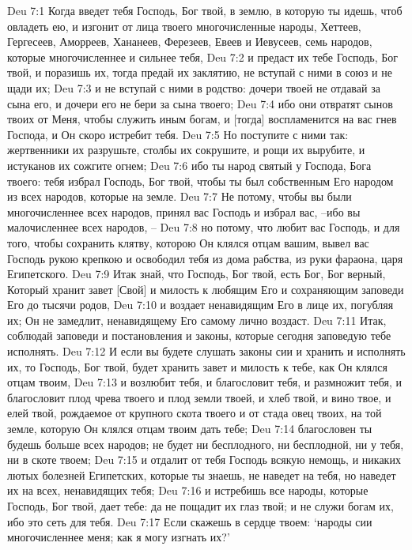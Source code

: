 Deu 7:1  Когда введет тебя Господь, Бог твой, в землю, в которую ты идешь, чтоб овладеть ею, и изгонит от лица твоего многочисленные народы, Хеттеев, Гергесеев, Аморреев, Хананеев, Ферезеев, Евеев и Иевусеев, семь народов, которые многочисленнее и сильнее тебя,
Deu 7:2  и предаст их тебе Господь, Бог твой, и поразишь их, тогда предай их заклятию, не вступай с ними в союз и не щади их;
Deu 7:3  и не вступай с ними в родство: дочери твоей не отдавай за сына его, и дочери его не бери за сына твоего;
Deu 7:4  ибо они отвратят сынов твоих от Меня, чтобы служить иным богам, и [тогда] воспламенится на вас гнев Господа, и Он скоро истребит тебя.
Deu 7:5  Но поступите с ними так: жертвенники их разрушьте, столбы их сокрушите, и рощи их вырубите, и истуканов их сожгите огнем;
Deu 7:6  ибо ты народ святый у Господа, Бога твоего: тебя избрал Господь, Бог твой, чтобы ты был собственным Его народом из всех народов, которые на земле.
Deu 7:7  Не потому, чтобы вы были многочисленнее всех народов, принял вас Господь и избрал вас, --ибо вы малочисленнее всех народов, --
Deu 7:8  но потому, что любит вас Господь, и для того, чтобы сохранить клятву, которою Он клялся отцам вашим, вывел вас Господь рукою крепкою и освободил тебя из дома рабства, из руки фараона, царя Египетского.
Deu 7:9  Итак знай, что Господь, Бог твой, есть Бог, Бог верный, Который хранит завет [Свой] и милость к любящим Его и сохраняющим заповеди Его до тысячи родов,
Deu 7:10  и воздает ненавидящим Его в лице их, погубляя их; Он не замедлит, ненавидящему Его самому лично воздаст.
Deu 7:11  Итак, соблюдай заповеди и постановления и законы, которые сегодня заповедую тебе исполнять.
Deu 7:12  И если вы будете слушать законы сии и хранить и исполнять их, то Господь, Бог твой, будет хранить завет и милость к тебе, как Он клялся отцам твоим,
Deu 7:13  и возлюбит тебя, и благословит тебя, и размножит тебя, и благословит плод чрева твоего и плод земли твоей, и хлеб твой, и вино твое, и елей твой, рождаемое от крупного скота твоего и от стада овец твоих, на той земле, которую Он клялся отцам твоим дать тебе;
Deu 7:14  благословен ты будешь больше всех народов; не будет ни бесплодного, ни бесплодной, ни у тебя, ни в скоте твоем;
Deu 7:15  и отдалит от тебя Господь всякую немощь, и никаких лютых болезней Египетских, которые ты знаешь, не наведет на тебя, но наведет их на всех, ненавидящих тебя;
Deu 7:16  и истребишь все народы, которые Господь, Бог твой, дает тебе: да не пощадит их глаз твой; и не служи богам их, ибо это сеть для тебя.
Deu 7:17  Если скажешь в сердце твоем: `народы сии многочисленнее меня; как я могу изгнать их?'
